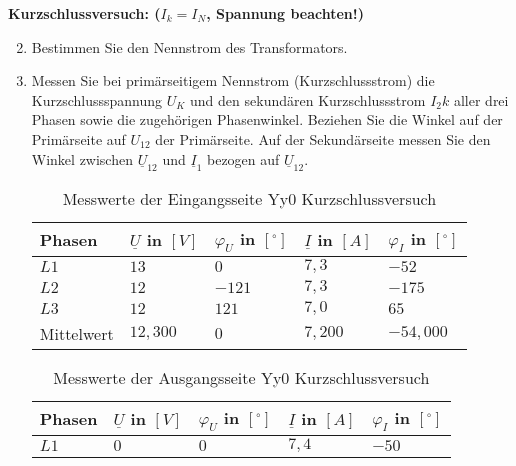 \textbf{Kurzschlussversuch: ($I_k = I_N$, Spannung beachten!)}
\begin{enumerate}[label=\alph*)]
  \setcounter{enumi}{1}
  \item Bestimmen Sie den Nennstrom des Transformators.
  \item Messen Sie bei primärseitigem Nennstrom (Kurzschlussstrom) die
        Kurzschlussspannung $U_K$ und den sekundären Kurzschlussstrom $I_2k$ aller drei
        Phasen sowie die zugehörigen Phasenwinkel. Beziehen Sie die Winkel auf der
        Primärseite auf $U_{12}$ der Primärseite. Auf der Sekundärseite messen Sie den
        Winkel zwischen $\underline U_{12}$ und $\underline I_1$ bezogen auf
        $\underline U_{12}$.

        \begin{table}[h!]
          \caption{Messwerte der Eingangsseite Yy0 Kurzschlussversuch}
          \centering
          \begin{tabular}{lllll}
            \\ \hline
            Phasen     & $\underline{U}$ in $[V]$ & $\varphi_{U}$ in $[^\circ]$ & $\underline{I}$ in $[A]$ & $\varphi_{I}$ in $[^\circ]$ \\ \hline
            $L1$       & $13$                     & $0$                         & $7,3$                    & $-52$                       \\
            $L2$       & $12$                     & $-121$                      & $7,3$                    & $-175$                      \\
            $L3$       & $12$                     & $121$                       & $7,0$                    & $65$                        \\ \hline
            Mittelwert & $12,300$                 & $0$                         & $7,200$                  & $-54,000$                   \\ \hline\hline
          \end{tabular}
        \end{table}
        \begin{table}[h!]
          \centering
          \caption{Messwerte der Ausgangsseite Yy0 Kurzschlussversuch}
          \begin{tabular}{lllll}
            \\ \hline
            Phasen     & $\underline{U}$ in $[V]$ & $\varphi_{U}$ in $[^\circ]$ & $\underline{I}$ in $[A]$ & $\varphi_{I}$ in $[^\circ]$ \\ \hline
            $L1$       & $0$                      & $0$                         & $7,4$                    & $-50$                       \\

\end{tabular}
\end{table}
\end{enumerate}
